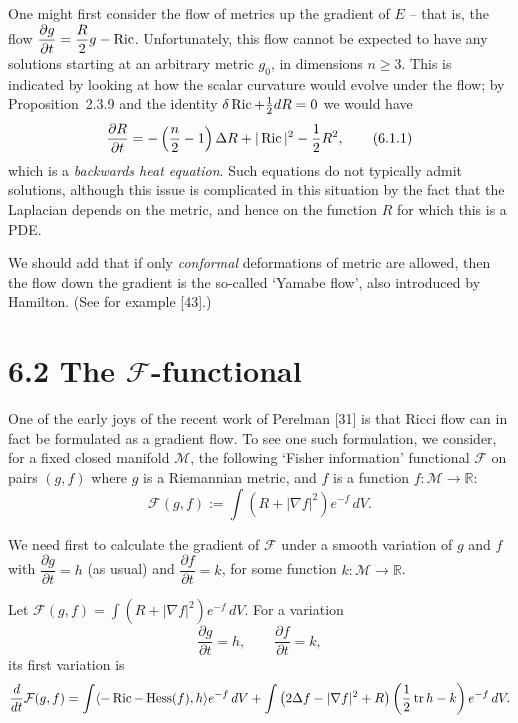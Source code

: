 One might first consider the flow of metrics up the gradient of $E$ -- that is,
the flow $\dfrac{\partial g}{\partial t}=\dfrac{R}{2}g-\operatorname{Ric}$.
Unfortunately, this flow cannot be expected to have any solutions starting at
an arbitrary metric $g_0$, in dimensions $n\geq 3$.
This is indicated by looking at how the scalar curvature would evolve under the
flow; by Proposition~2.3.9 and the identity $\delta\operatorname{Ric}+\frac{1}{2}dR=0$ we
would have
\[
\frac{\partial R}{\partial t}
=-\left(\frac{n}{2}-1\right)\Delta R+|\operatorname{Ric}|^2-\frac{1}{2}R^2,
\tag{6.1.1}
\]
which is a \emph{backwards heat equation}. Such equations do not typically admit
solutions, although this issue is complicated in this situation by the fact that
the Laplacian depends on the metric, and hence on the function $R$ for which
this is a PDE.

We should add that if only \emph{conformal} deformations of metric are allowed,
then the flow down the gradient is the so-called `Yamabe flow', also introduced
by Hamilton. (See for example [43].)

\section{6.2 \quad The $\mathcal{F}$-functional}

One of the early joys of the recent work of Perelman [31] is that Ricci flow
can in fact be formulated as a gradient flow. To see one such formulation, we
consider, for a fixed closed manifold $\mathcal M$, the following `Fisher
information' functional $\mathcal F$ on pairs $(g,f)$ where $g$ is a Riemannian
metric, and $f$ is a function $f:\mathcal M\to\mathbb{R}$:
\[
\mathcal{F}(g,f):=\int \left(R+|\nabla f|^2\right)e^{-f}\,dV.
\]

We need first to calculate the gradient of $\mathcal F$ under a smooth
variation of $g$ and $f$ with $\dfrac{\partial g}{\partial t}=h$ (as usual) and
$\dfrac{\partial f}{\partial t}=k$, for some function $k:\mathcal M\to\mathbb{R}$.

\begin{proposition}
\label{topping-gradient-flow-f-functional-first-variation}
Let $\mathcal F(g,f)=\int (R+|\nabla f|^2)e^{-f}\,dV$. For a variation
\[
\frac{\partial g}{\partial t}=h, \qquad \frac{\partial f}{\partial t}=k,
\]
its first variation is
\[
\frac{d}{dt}\mathcal{F}(g,f)
=\int \langle-\operatorname{Ric}-\operatorname{Hess}(f),h\rangle e^{-f}\,dV
+\int \left(2\Delta f-|\nabla f|^2+R\right)\left(\frac{1}{2}\operatorname{tr} h-k\right)e^{-f}\,dV.
\]
\end{proposition}

